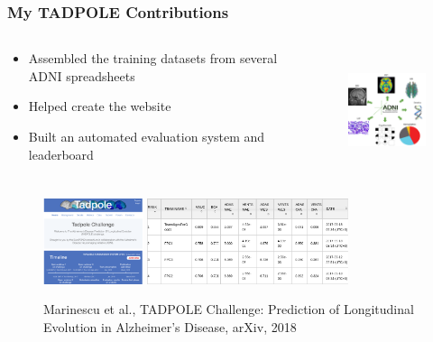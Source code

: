 \documentclass[8pt,xcolor=table]{beamer}
\begin{document}
\begin{frame}
\frametitle{My TADPOLE Contributions}

\begin{columns}[T]
\begin{column}{.55\textwidth}
\begin{itemize}
 \item Assembled the training datasets from several ADNI spreadsheets
 \item Helped create the website
 \item Built an automated evaluation system and leaderboard
\end{itemize}
\end{column}
\begin{column}{.45\textwidth}
\begin{figure}
 \centering
 \vspace{-2em}
\includegraphics[height=3.5cm]{tadpole_data_types}
\end{figure}

\end{column}
\end{columns}

\begin{figure}
\centering
\includegraphics[height=2.5cm,trim=0 270 0 0,clip]{tadpole} \hspace{1em}
\includegraphics[height=2.5cm]{leaderboard}

Marinescu et al., TADPOLE Challenge: Prediction of Longitudinal Evolution in Alzheimer's Disease, arXiv, 2018
\end{figure}


\end{frame}
\end{document}
